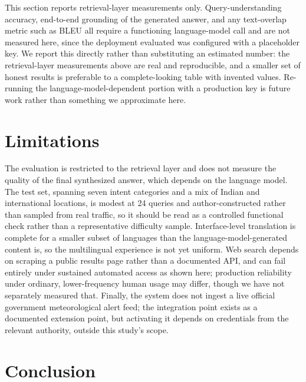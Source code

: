 \documentclass[sigconf,natbib=true,anonymous=true]{acmart}
\begin{document}
This section reports retrieval-layer measurements only. Query-understanding accuracy, end-to-end grounding of the generated answer, and any text-overlap metric such as BLEU all require a functioning language-model call and are not measured here, since the deployment evaluated was configured with a placeholder key. We report this directly rather than substituting an estimated number: the retrieval-layer measurements above are real and reproducible, and a smaller set of honest results is preferable to a complete-looking table with invented values. Re-running the language-model-dependent portion with a production key is future work rather than something we approximate here.

\section{Limitations}
\label{sec:limitations}

The evaluation is restricted to the retrieval layer and does not measure the quality of the final synthesized answer, which depends on the language model. The test set, spanning seven intent categories and a mix of Indian and international locations, is modest at 24 queries and author-constructed rather than sampled from real traffic, so it should be read as a controlled functional check rather than a representative difficulty sample. Interface-level translation is complete for a smaller subset of languages than the language-model-generated content is, so the multilingual experience is not yet uniform. Web search depends on scraping a public results page rather than a documented API, and can fail entirely under sustained automated access as shown here; production reliability under ordinary, lower-frequency human usage may differ, though we have not separately measured that. Finally, the system does not ingest a live official government meteorological alert feed; the integration point exists as a documented extension point, but activating it depends on credentials from the relevant authority, outside this study's scope.

\section{Conclusion}
\label{sec:conclusion}
\end{document}
